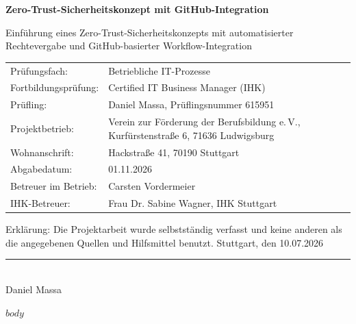 \documentclass[11pt,a4paper]{article}
\begin{document}
\begin{center}
\Large\bfseries Zero-Trust-Sicherheitskonzept mit GitHub-Integration\par
\vspace{4mm}
\large Einführung eines Zero-Trust-Sicherheitskonzepts mit automatisierter Rechtevergabe und GitHub-basierter Workflow-Integration\par
\end{center}
\vspace{8mm}
\begin{tabular}{@{}p{5cm}p{9.5cm}@{}}
Prüfungsfach: & Betriebliche IT-Prozesse \\
Fortbildungsprüfung: & Certified IT Business Manager (IHK) \\
Prüfling: & Daniel Massa, Prüflingsnummer 615951 \\
Projektbetrieb: & Verein zur Förderung der Berufsbildung e.\,V., Kurfürstenstraße 6, 71636 Ludwigsburg \\
Wohnanschrift: & Hackstraße 41, 70190 Stuttgart \\
Abgabedatum: & 01.11.2026 \\
Betreuer im Betrieb: & Carsten Vordermeier \\
IHK-Betreuer: & Frau Dr. Sabine Wagner, IHK Stuttgart \\
\end{tabular}
\vspace{10mm}
Erklärung: Die Projektarbeit wurde selbstständig verfasst und keine anderen als die angegebenen Quellen und Hilfsmittel benutzt.
\vspace{15mm}
Stuttgart, den 10.07.2026 \hfill \rule{6cm}{0.4pt} \\
\phantom{Stuttgart, den 10.07.2026} \hfill Daniel Massa

\newpage
{}
\setcounter{page}{1}
\tableofcontents
\newpage
$body$
\end{document}
